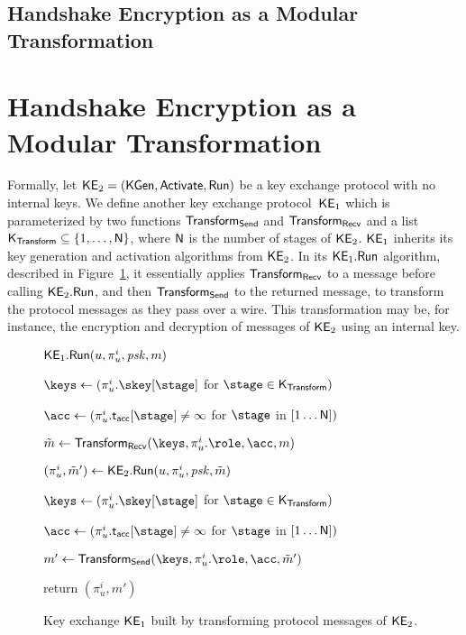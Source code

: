 \iffull
	\subsection{Handshake Encryption as a Modular Transformation}
\else
	\section{Handshake Encryption as a Modular Transformation}
	\label{app:modular-transform}
\fi

Formally, let $\mathsf{KE}_2 = (\mathsf{KGen}, \mathsf{Activate}, \mathsf{Run})$ be a key exchange protocol with no internal keys. 
We define another key exchange protocol~$\mathsf{KE}_1$ which is parameterized by two functions $\mathsf{Transform}_{\mathsf{Send}}$ and $\mathsf{Transform}_{\mathsf{Recv}}$ and a list $\mathsf{K}_{\mathsf{Transform}} \subseteq \{1, \ldots, \mathsf{N}\}$, where $\mathsf{N}$ is the number of stages of $\mathsf{KE}_{2}$. $\mathsf{KE}_1$ inherits its key generation and activation algorithms from $\mathsf{KE}_2$. 
In its $\mathsf{KE}_1.\mathsf{Run}$ algorithm, described in Figure~\ref{fig:encrypted-ke}, it essentially applies $\mathsf{Transform}_{\mathsf{Recv}}$ to a message before calling $\mathsf{KE}_2.\mathsf{Run}$, and then $\mathsf{Transform}_{\mathsf{Send}}$ to the returned message, to transform the protocol messages as they pass over a wire.
This transformation may be, for instance, the encryption and decryption of messages of $\mathsf{KE}_{2}$ using an internal key.

\begin{figure}[p]
	\centering
	\begin{minipage}[t]{9cm}
		\begin{algorithm}{$\mathsf{KE}_1.\mathsf{Run}(u,\pi^i_u, \mathit{psk}, m)$}
			\item $\keys \gets (\pi^i_u.\skey[\stage]$ for $\stage \in \MaulKeys)$
			\item $\acc \gets (\pi^i_u.\taccepted[\stage] \neq \infty$ for $\stage$ in $[1\ldots\mathsf{N}])$
			\item $\tilde{m} \gets \MaulRecv(\keys, \pi^i_u.\role, \acc, m)$
			\item $(\pi^i_u, \tilde{m}') \gets \mathsf{KE}_2.\mathsf{Run}(u,\pi^i_u, \mathit{psk}, \tilde{m})$
			\item $\keys \gets (\pi^i_u.\skey[\stage]$ for $\stage \in \MaulKeys)$
			\item $\acc \gets (\pi^i_u.\taccepted[\stage] \neq \infty$ for $\stage$ in $[1\ldots\mathsf{N}])$
			\item $m' \gets \MaulSend(\keys, \pi^i_u.\role, \acc, \tilde{m}')$
			\item return $(\pi^i_u, m')$
		\end{algorithm}
	\end{minipage}
	\caption{Key exchange $\mathsf{KE}_1$ built by transforming protocol messages of $\mathsf{KE}_2$.}
	\label{fig:encrypted-ke}
\end{figure}

